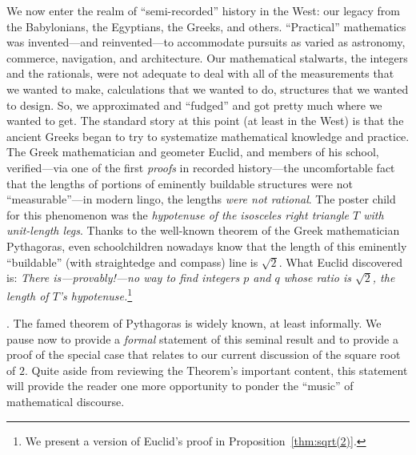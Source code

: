 \bigskip

\noindent {}

\bigskip

 

\noindent
We now enter the realm of ``semi-recorded'' history in the West: our legacy from the Babylonians, the Egyptians, the Greeks, and others.  ``Practical'' mathematics was invented---and reinvented---to accommodate pursuits as varied as astronomy, commerce, navigation, and architecture.  Our mathematical stalwarts, the integers and the rationals, were not adequate to deal with all of the measurements that we wanted to make, calculations that we wanted to do, structures that we wanted to design.  So, we approximated and ``fudged'' and got pretty much where we wanted to get.  The standard story at this point (at least in the West) is that the ancient Greeks began to try to systematize mathematical knowledge and practice.  The Greek mathematician and geometer Euclid,  and members of his school, verified---via one of the first {\em proofs} in recorded history---the uncomfortable fact that the lengths of portions of eminently buildable structures were not ``measurable''---in modern lingo, the lengths {\em were not rational}.  The poster child for this phenomenon was the {\em hypotenuse of the isosceles right triangle $T$ with unit-length legs}.  Thanks to the well-known theorem of the Greek mathematician Pythagoras, even schoolchildren nowadays know that the length of this eminently ``buildable'' (with straightedge and compass) line is $\sqrt{2}$.  What Euclid discovered is: {\em There is---provably!---no way to find integers $p$ and $q$ whose ratio is $\sqrt{2}$, the length of $T$'s hypotenuse.}\footnote{We present a version of Euclid's proof in Proposition~\ref{thm:sqrt(2)}.}

\bigskip


.
The famed theorem of Pythagoras is widely known, at least informally.  We pause now to provide a {\em formal} statement of this seminal result and to provide a proof of the special case that relates to our current discussion of the square root of $2$.  Quite aside from reviewing the Theorem's important content, this statement will provide the reader one more opportunity to ponder the ``music'' of mathematical discourse.

